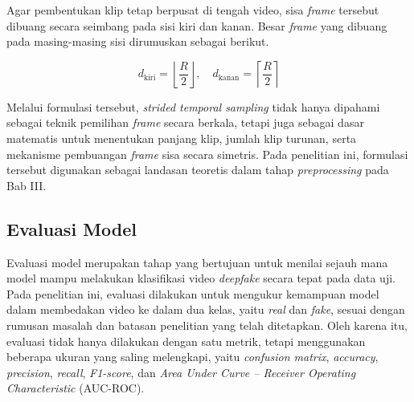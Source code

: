 Agar pembentukan klip tetap berpusat di tengah video, sisa \textit{frame} tersebut dibuang secara seimbang pada sisi kiri dan kanan. Besar \textit{frame} yang dibuang pada masing-masing sisi dirumuskan sebagai berikut.

\vspace{0.5\baselineskip}
\begin{equation}
d_{\text{kiri}} = \left\lfloor \frac{R}{2} \right\rfloor, \quad d_{\text{kanan}} = \left\lceil \frac{R}{2} \right\rceil
\label{eq:symmetric-discard}
\end{equation}
\vspace{0.5\baselineskip}

Melalui formulasi tersebut, \textit{strided temporal sampling} tidak hanya dipahami sebagai teknik pemilihan \textit{frame} secara berkala, tetapi juga sebagai dasar matematis untuk menentukan panjang klip, jumlah klip turunan, serta mekanisme pembuangan \textit{frame} sisa secara simetris. Pada penelitian ini, formulasi tersebut digunakan sebagai landasan teoretis dalam tahap \textit{preprocessing} pada Bab III. \par

\subsection{Evaluasi Model} \label{II.Teori7}
Evaluasi model merupakan tahap yang bertujuan untuk menilai sejauh mana model mampu melakukan klasifikasi video \textit{deepfake} secara tepat pada data uji. Pada penelitian ini, evaluasi dilakukan untuk mengukur kemampuan model dalam membedakan video ke dalam dua kelas, yaitu \textit{real} dan \textit{fake}, sesuai dengan rumusan masalah dan batasan penelitian yang telah ditetapkan. Oleh karena itu, evaluasi tidak hanya dilakukan dengan satu metrik, tetapi menggunakan beberapa ukuran yang saling melengkapi, yaitu \textit{confusion matrix}, \textit{accuracy}, \textit{precision}, \textit{recall}, \textit{F1-score}, dan \textit{Area Under Curve -- Receiver Operating Characteristic} (AUC-ROC). \par


